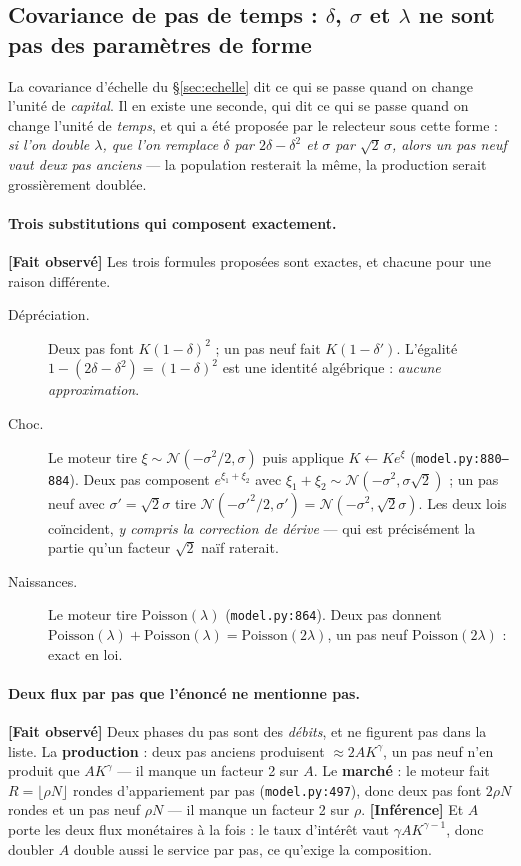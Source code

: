 \documentclass[11pt,a4paper]{article}
\newcommand{\code}[1]{\texttt{#1}}
\newcommand{\fait}{\textbf{[Fait observé]}}
\newcommand{\inference}{\textbf{[Inférence]}}
\begin{document}
\subsection{Covariance de pas de temps : $\delta$, $\sigma$ et $\lambda$ ne
sont pas des paramètres de forme}
\label{sec:temps}

La covariance d'échelle du §\ref{sec:echelle} dit ce qui se passe quand on
change l'unité de \emph{capital}. Il en existe une seconde, qui dit ce qui se
passe quand on change l'unité de \emph{temps}, et qui a été proposée par le
relecteur sous cette forme : \emph{si l'on double $\lambda$, que l'on remplace
$\delta$ par $2\delta - \delta^2$ et $\sigma$ par $\sqrt{2}\,\sigma$, alors un
pas neuf vaut deux pas anciens} --- la population resterait la même, la
production serait grossièrement doublée.

\paragraph{Trois substitutions qui composent exactement.} \fait{} Les trois
formules proposées sont exactes, et chacune pour une raison différente.

\begin{description}
\item[Dépréciation.] Deux pas font $K(1-\delta)^2$ ; un pas neuf fait
  $K(1-\delta')$. L'égalité $1 - (2\delta - \delta^2) = (1-\delta)^2$ est une
  identité algébrique : \emph{aucune approximation}.
\item[Choc.] Le moteur tire $\xi \sim \mathcal{N}(-\sigma^2/2, \sigma)$ puis
  applique $K \leftarrow K e^{\xi}$ (\code{model.py:880--884}). Deux pas
  composent $e^{\xi_1 + \xi_2}$ avec
  $\xi_1 + \xi_2 \sim \mathcal{N}(-\sigma^2, \sigma\sqrt{2})$ ; un pas neuf
  avec $\sigma' = \sqrt{2}\sigma$ tire
  $\mathcal{N}(-\sigma'^2/2, \sigma') = \mathcal{N}(-\sigma^2, \sqrt{2}\sigma)$.
  Les deux lois coïncident, \emph{y compris la correction de dérive} --- qui
  est précisément la partie qu'un facteur $\sqrt{2}$ naïf raterait.
\item[Naissances.] Le moteur tire $\text{Poisson}(\lambda)$
  (\code{model.py:864}). Deux pas donnent
  $\text{Poisson}(\lambda) + \text{Poisson}(\lambda) = \text{Poisson}(2\lambda)$,
  un pas neuf $\text{Poisson}(2\lambda)$ : exact en loi.
\end{description}

\paragraph{Deux flux par pas que l'énoncé ne mentionne pas.} \fait{} Deux
phases du pas sont des \emph{débits}, et ne figurent pas dans la liste. La
\textbf{production} : deux pas anciens produisent $\approx 2AK^{\gamma}$, un
pas neuf n'en produit que $AK^{\gamma}$ --- il manque un facteur 2 sur $A$.
Le \textbf{marché} : le moteur fait $R = \lfloor \rho N \rfloor$ rondes
d'appariement par pas (\code{model.py:497}), donc deux pas font $2\rho N$
rondes et un pas neuf $\rho N$ --- il manque un facteur 2 sur $\rho$.
\inference{} Et $A$ porte les deux flux monétaires à la fois : le taux
d'intérêt vaut $\gamma A K^{\gamma-1}$, donc doubler $A$ double aussi le
service par pas, ce qu'exige la composition.
\end{document}
